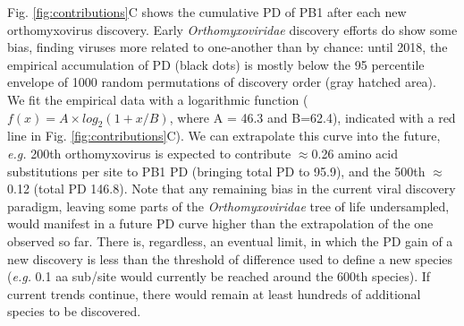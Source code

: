 \documentclass[11pt,twocolumn]{article}
\begin{document}
Fig. \ref{fig:contributions}C shows the cumulative PD of PB1 after each new orthomyxovirus discovery. Early \textit{Orthomyxoviridae} discovery efforts do show some bias, finding viruses more related to one-another than by chance: until 2018, the empirical accumulation of PD (black dots) is mostly below the 95 percentile envelope of 1000 random permutations of discovery order (gray hatched area). We fit the empirical data with a logarithmic function ($f(x) = A \times log_{2} (1 + x/B)$, where A = 46.3 and B=62.4), indicated with a red line in Fig. \ref{fig:contributions}C). We can extrapolate this curve into the future, \textit{e.g.} 200th orthomyxovirus is expected to contribute $\approx$0.26 amino acid substitutions per site to PB1 PD (bringing total PD to 95.9), and the 500th $\approx$0.12 (total PD 146.8). Note that any remaining bias in the current viral discovery paradigm, leaving some parts of the \textit{Orthomyxoviridae} tree of life undersampled, would manifest in a future PD curve higher than the extrapolation of the one observed so far. There is, regardless, an eventual limit, in which the PD gain of a new discovery is less than the threshold of difference used to define a new species (\textit{e.g.} 0.1 aa sub/site would currently be reached around the 600th species). If current trends continue, there would remain at least hundreds of additional species to be discovered.
\end{document}
